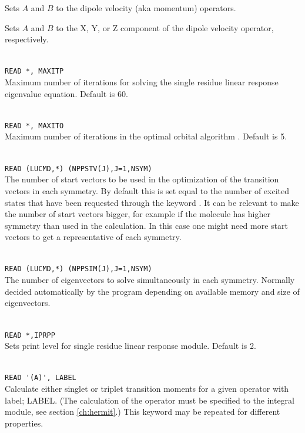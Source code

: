 \begin{description}
\item{}
Sets $A$ and $B$ to the dipole velocity (aka momentum) operators.

\item{}
Sets $A$ and $B$ to the X, Y, or Z component of the dipole velocity
operator, respectively.

\item{}\\
\verb|READ *, MAXITP|\\
Maximum number of iterations for solving the single residue
linear response eigenvalue equation. Default is 60.

\item{}\\
\verb|READ *, MAXITO|\\
Maximum number of iterations in the optimal orbital
algorithm
\cite{tuhjahjajpjjcp84}.
Default is 5.

\item{}\\
\verb|READ (LUCMD,*) (NPPSTV(J),J=1,NSYM)|\\
 The number of start vectors to be used in the
  optimization of the transition vectors in each symmetry. By default
  this is set equal to the number of excited states that have been
  requested through the keyword .
  It can be relevant to make the number of start vectors bigger,
  for example if the molecule has higher symmetry than used in the
  calculation. In this case one might need more start vectors to
  get a representative of each symmetry.

\item{}\\
\verb|READ (LUCMD,*) (NPPSIM(J),J=1,NSYM)|\\
The number of eigenvectors to solve simultaneously in each
symmetry. Normally decided automatically by the program depending on
available memory and size of eigenvectors.

\item{}\\
\verb|READ *,IPRPP|\\
Sets print level for single residue linear response module. Default is 2.

\item{}\\
\verb|READ '(A)', LABEL|\\
Calculate either singlet or triplet transition moments for a given operator with label; LABEL.
(The calculation of the operator must be specified to the integral
module, see section \ref{ch:hermit}.)
This keyword may be repeated for different properties.


\end{description}
